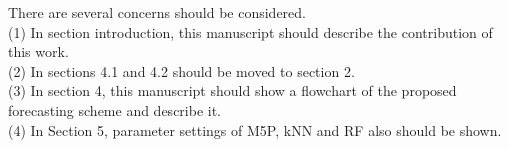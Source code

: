 \documentclass[preprint]{elsarticle}
\begin{document}
\noindent There are several concerns should be considered. \\

\noindent (1) In section introduction, this manuscript should describe the contribution of this work.\\

\noindent (2) In sections 4.1 and 4.2 should be moved to section 2.\\

\noindent (3) In section 4, this manuscript should show a flowchart of the proposed forecasting scheme and describe it.\\

\noindent (4) In Section 5, parameter settings of M5P, kNN and RF also should be shown.
\end{document}
